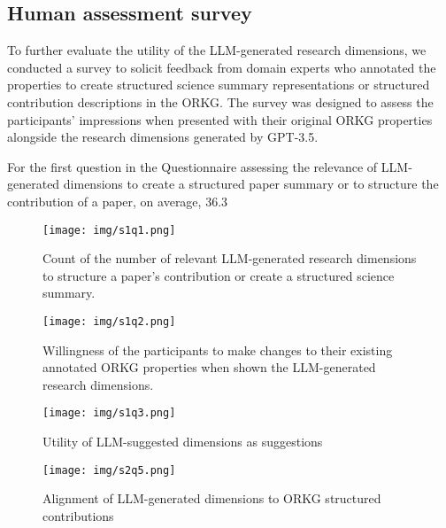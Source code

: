 \subsection{Human assessment survey}

To further evaluate the utility of the LLM-generated research dimensions, we conducted a survey to solicit feedback from domain experts who annotated the properties to create structured science summary representations or structured contribution descriptions in the ORKG. The survey was designed to assess the participants' impressions when presented with their original ORKG properties alongside the research dimensions generated by GPT-3.5.

For the first question in the Questionnaire assessing the relevance of LLM-generated dimensions to create a structured paper summary or to structure the contribution of a paper, on average, 36.3\
\begin{figure}[!htb]
\texttt{[image: img/s1q1.png]}
\caption{Count of the number of relevant LLM-generated research dimensions to structure a paper's contribution or create a structured science summary.\label{figure s1q1}}
\end{figure} 


\begin{figure}[!htb]
\texttt{[image: img/s1q2.png]}
\caption{Willingness of the participants to make changes to their existing annotated ORKG properties when shown the LLM-generated research dimensions. \label{figure s1q2}}
\end{figure} 

\begin{figure}[!htb]
\texttt{[image: img/s1q3.png]}
\caption{Utility of LLM-suggested dimensions as suggestions\label{figure s1q3}}
\end{figure} 

\begin{figure}[!htb]
\texttt{[image: img/s2q5.png]}
\caption{Alignment of LLM-generated dimensions to ORKG structured contributions\label{figure s2q5}}
\end{figure} 

